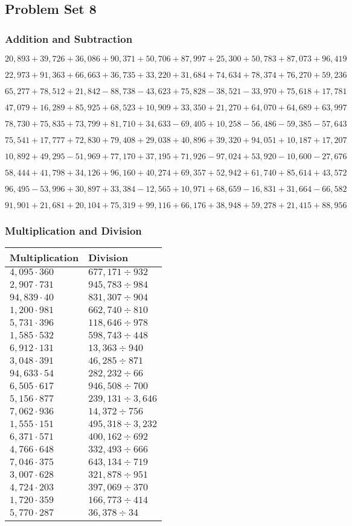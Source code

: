 \hypertarget{problem-set-8-4}{%
\subsection{Problem Set 8}\label{problem-set-8-4}}

\hypertarget{addition-and-subtraction-230}{%
\subsubsection{Addition and
Subtraction}\label{addition-and-subtraction-230}}

\(20,893+39,726+36,086+90,371+50,706+87,997+25,300+50,783+87,073+ 96,419\)

\(22,973+91,363+66,663+36,735+33,220+31,684+74,634+78,374+76,270+59,236\)

\(65,277+78,512+21,842-88,738-43,623+75,828-38,521-33,970+75,618+17,781\)

\(47,079+16,289+85,925+68,523+10,909+33,350+21,270+64,070+64,689+63,997\)

\(78,730+75,835+73,799+81,710+34,633-69,405+10,258-56,486-59,385-57,643\)

\(75,541+17,777+72,830+79,408+29,038+40,896+39,320+94,051+10,187+17,207\)

\(10,892+49,295-51,969+77,170+37,195+71,926-97,024+53,920-10,600-27,676\)

\(58,444+41,798+34,126+96,160+40,274+69,357+52,942+61,740+85,614+43,572\)

\(96,495-53,996+30,897+33,384-12,565+10,971+68,659-16,831+31,664-66,582\)

\(91,901+21,681+20,104+75,319+99,116+66,176+38,948+59,278+21,415+88,956\)

\hypertarget{multiplication-and-division-229}{%
\subsubsection{Multiplication and
Division}\label{multiplication-and-division-229}}

\begin{longtable}[]{@{}ll@{}}
\toprule
Multiplication & Division\tabularnewline
\midrule
\endhead
\(4,095\cdot360\) & \(677,171÷932\)\tabularnewline
\(2,907\cdot731\) & \(945,783÷984\)\tabularnewline
\(94,839\cdot40\) & \(831,307÷904\)\tabularnewline
\(1,200\cdot981\) & \(662,740÷810\)\tabularnewline
\(5,731\cdot396\) & \(118,646÷978\)\tabularnewline
\(1,585\cdot532\) & \(598,743÷448\)\tabularnewline
\(6,912\cdot131\) & \(13,363÷940\)\tabularnewline
\(3,048\cdot391\) & \(46,285÷871\)\tabularnewline
\(94,633\cdot54\) & \(282,232÷66\)\tabularnewline
\(6,505\cdot617\) & \(946,508÷700\)\tabularnewline
\(5,156\cdot877\) & \(239,131÷3,646\)\tabularnewline
\(7,062\cdot936\) & \(14,372÷756\)\tabularnewline
\(1,555\cdot151\) & \(495,318÷3,232\)\tabularnewline
\(6,371\cdot571\) & \(400,162÷692\)\tabularnewline
\(4,766\cdot648\) & \(332,493÷666\)\tabularnewline
\(7,046\cdot375\) & \(643,134÷719\)\tabularnewline
\(3,007\cdot628\) & \(321,878÷951\)\tabularnewline
\(4,724\cdot203\) & \(397,069÷370\)\tabularnewline
\(1,720\cdot359\) & \(166,773÷414\)\tabularnewline
\(5,770\cdot287\) & \(36,378÷34\)\tabularnewline
\bottomrule
\end{longtable}

